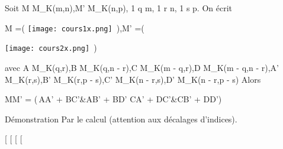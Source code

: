 \documentclass[]{article}
\begin{document}
Soit M \in M_K(m,n),M' \in M_K(n,p), 1 \leq q \leq m, 1 \leq r \leq n,
1 \leq s \leq p. On écrit

M =\left ( \texttt{[image: cours1x.png]}
\,\right ),\quad M'
=\left (

\texttt{[image: cours2x.png]} \,\right )

avec A \in M_K(q,r),B \in M_K(q,n - r),C \in M_K(m
- q,r),D \in M_K(m - q,n - r),A' \in M_K(r,s),B' \in
M_K(r,p - s),C' \in M_K(n - r,s),D' \in M_K(n -
r,p - s) Alors

MM' = \left (\matrix\,AA'
+ BC'&AB' + BD' \cr CA' + DC'&CB' +
DD'\right )

Démonstration Par le calcul (attention aux décalages d'indices).

[
[
[
[
\end{document}
